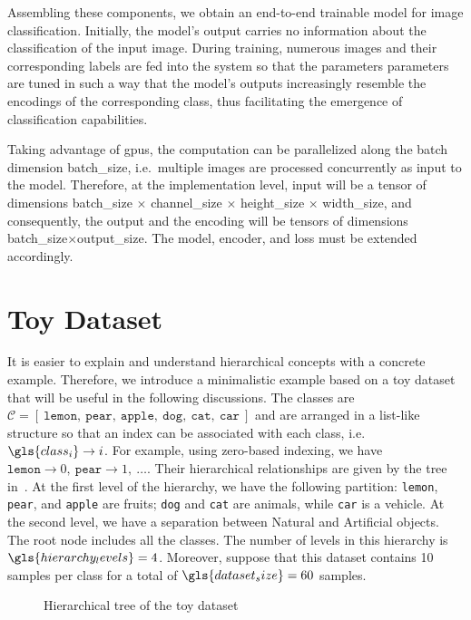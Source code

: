 Assembling these components, we obtain an end-to-end trainable model for image classification. Initially, the model's output carries no information about the classification of the input image. During training, numerous images and their corresponding labels are fed into the system so that the parameters \gls{parameters} are tuned in such a way that the model's outputs increasingly resemble the encodings of the corresponding class, thus facilitating the emergence of classification capabilities.

Taking advantage of \acrshort{gpu}s, the computation can be parallelized along the batch dimension \gls{batch_size}, i.e.\ multiple images are processed concurrently as input to the model. Therefore, at the implementation level, \gls{input} will be a tensor of dimensions \gls{batch_size} $\times$ \gls{channel_size} $\times$ \gls{height_size} $\times$ \gls{width_size}, and consequently, the output and the encoding will be tensors of dimensions \gls{batch_size}$\times$\gls{output_size}. The \gls{model}, \gls{encoder}, and \gls{loss} must be extended accordingly.


\section{Toy Dataset}
\label{sec:toy-dataset}

It is easier to explain and understand hierarchical concepts with a concrete example. Therefore, we introduce a minimalistic example based on a toy dataset that will be useful in the following discussions. The classes are $\mathcal{C} = [\ \texttt{lemon},\ \texttt{pear},\ \texttt{apple},\ \texttt{dog},\ \texttt{cat},\ \texttt{car}\ ]$ and are arranged in a list-like structure so that an index can be associated with each class, i.e.\ $\gls{class_i} \to i$.
For example, using zero-based indexing, we have $\texttt{lemon} \to 0,\ \texttt{pear} \to 1,\ \ldots$. Their hierarchical relationships are given by the tree in~. At the first level of the hierarchy, we have the following partition: \texttt{lemon}, \texttt{pear}, and \texttt{apple} are fruits; \texttt{dog} and \texttt{cat} are animals, while \texttt{car} is a vehicle. At the second level, we have a separation between Natural and Artificial objects. The root node includes all the classes. The number of levels in this hierarchy is $\gls{hierarchy_levels} = 4$. Moreover, suppose that this dataset contains 10 samples per class for a total of $\gls{dataset_size} = 60$ samples.
\begin{figure}[htbp]
  \caption{Hierarchical tree of the toy dataset}
  \label{fig:03/toy-dataset}
\end{figure}

